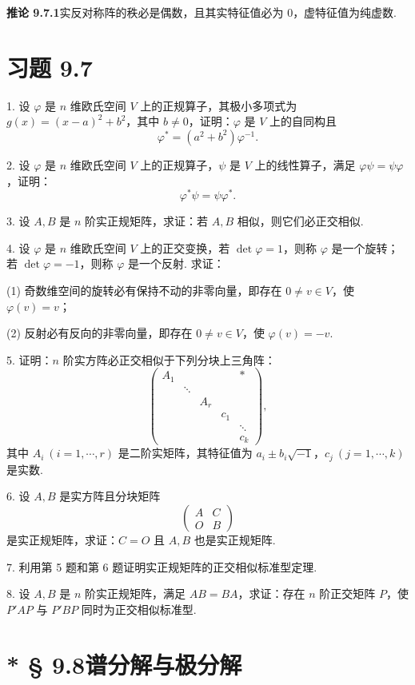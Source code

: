 \documentclass[UTF8,12pt,a4paper,fontset=fandol]{ctexart}
\begin{document}
\noindent\textbf{推论 9.7.1}\quad 实反对称阵的秩必是偶数，且其实特征值必为 $0$，虚特征值为纯虚数.

\section*{习题 9.7}

1. 设 $\varphi$ 是 $n$ 维欧氏空间 $V$ 上的正规算子，其极小多项式为 $g(x)=(x-a)^2+b^2$，其中 $b\ne0$，证明：$\varphi$ 是 $V$ 上的自同构且
\[
  \varphi^*=(a^2+b^2)\varphi^{-1}.
\]

2. 设 $\varphi$ 是 $n$ 维欧氏空间 $V$ 上的正规算子，$\psi$ 是 $V$ 上的线性算子，满足 $\varphi\psi=\psi\varphi$，证明：
\[
  \varphi^*\psi=\psi\varphi^*.
\]

3. 设 $A,B$ 是 $n$ 阶实正规矩阵，求证：若 $A,B$ 相似，则它们必正交相似.

4. 设 $\varphi$ 是 $n$ 维欧氏空间 $V$ 上的正交变换，若 $\det\varphi=1$，则称 $\varphi$ 是一个旋转；若 $\det\varphi=-1$，则称 $\varphi$ 是一个反射. 求证：

(1) 奇数维空间的旋转必有保持不动的非零向量，即存在 $0\ne v\in V$，使 $\varphi(v)=v$；

(2) 反射必有反向的非零向量，即存在 $0\ne v\in V$，使 $\varphi(v)=-v$.

5. 证明：$n$ 阶实方阵必正交相似于下列分块上三角阵：
\[
  \left(\begin{array}{ccccc}
    A_1 & & & & *\\
    & \ddots & & &\\
    & & A_r & &\\
    & & & c_1 &\\
    & & & & \ddots\\
    & & & & c_k
  \end{array}\right),
\]
其中 $A_i\ (i=1,\cdots,r)$ 是二阶实矩阵，其特征值为 $a_i\pm b_i\sqrt{-1}$，$c_j\ (j=1,\cdots,k)$ 是实数.

6. 设 $A,B$ 是实方阵且分块矩阵
\[
  \left(\begin{array}{cc}
    A & C\\
    O & B
  \end{array}\right)
\]
是实正规矩阵，求证：$C=O$ 且 $A,B$ 也是实正规矩阵.

7. 利用第 5 题和第 6 题证明实正规矩阵的正交相似标准型定理.

8. 设 $A,B$ 是 $n$ 阶实正规矩阵，满足 $AB=BA$，求证：存在 $n$ 阶正交矩阵 $P$，使 $P'AP$ 与 $P'BP$ 同时为正交相似标准型.

\section*{* § 9.8\quad 谱分解与极分解}
\end{document}
